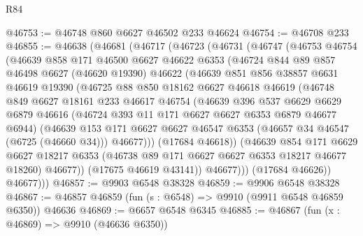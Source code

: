 \begin{lexlean}{R84}
\begin{coremodule}
@46753 := @46748 @860 @6627 @46502 @233 @46624
@46754 := @46708 @233
@46855 := @46638
    (@46681
      (@46717
        (@46723
          (@46731
            (@46747
              (@46753
                @46754
                (@46639
                  @858
                  @171
                  @46500
                  @6627
                  @46622
                  @6353
                  (@46724
                    @844
                    @89
                    @857
                    @46498
                    @6627
                    (@46620 @19390)
                    @46622
                    (@46639
                      @851
                      @856
                      @38857
                      @6631
                      @46619
                      @19390
                      (@46725
                        @88
                        @850
                        @18162
                        @6627
                        @46618
                        @46619
                        (@46748
                          @849
                          @6627
                          @18161
                          @233
                          @46617
                          @46754
                          (@46639
                            @396
                            @537
                            @6629
                            @6629
                            @6879
                            @46616
                            (@46724 @393 @11 @171 @6627 @6627 @6353 @6879 @46677 @6944)
                            (@46639
                              @153
                              @171
                              @6627
                              @6627
                              @46547
                              @6353
                              (@46657 @34 @46547 (@6725 (@46660 @34)))
                              @46677)))
                        (@17684 @46618))
                      (@46639
                        @854
                        @171
                        @6629
                        @6627
                        @18217
                        @6353
                        (@46738 @89 @171 @6627 @6627 @6353 @18217 @46677 @18260)
                        @46677))
                    (@17675 @46619 @43141))
                  @46677)))
            (@17684 @46626))
          @46677)))
@46857 := @9903 @6548 @38328
@46859 := @9906 @6548 @38328
@46867 := @46857 @46859 (fun (s : @6548) => @9910 (@9911 @6548 @46859 @6350)) @46636
@46869 := @6657 @6548 @6345
@46885 := @46867
    (fun (x : @46869) => @9910 (@46636 @6350))

\end{coremodule}
\end{lexlean}
